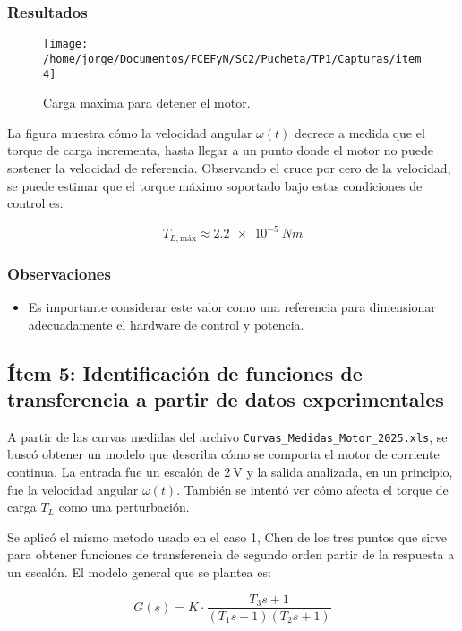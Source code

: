 \documentclass{article}
\begin{document}
\subsubsection*{Resultados}

\begin{figure}[ht!]
      \centering
        \texttt{[image: /home/jorge/Documentos/FCEFyN/SC2/Pucheta/TP1/Capturas/item4]}
          \caption{Carga maxima para detener el motor.}
            \label{fig:etiqueta5}
        \end{figure} 

La figura muestra cómo la velocidad angular $\omega(t)$ decrece a medida que el torque de carga incrementa, hasta llegar a un punto donde el motor no puede sostener la velocidad de referencia. Observando el cruce por cero de la velocidad, se puede estimar que el torque máximo soportado bajo estas condiciones de control es:

\[
T_{L, \text{máx}} \approx \SI{2.2e-5}{Nm}
\]


\subsubsection*{Observaciones}
\begin{itemize}
    \item Es importante considerar este valor como una referencia para dimensionar adecuadamente el hardware de control y potencia.
\end{itemize}



\subsection{Ítem 5: Identificación de funciones de transferencia a partir de datos experimentales}

A partir de las curvas medidas del archivo \texttt{Curvas\_Medidas\_Motor\_2025.xls}, se buscó obtener un modelo que describa cómo se comporta el motor de corriente continua. La entrada fue un escalón de $2\ \text{V}$ y la salida analizada, en un principio, fue la velocidad angular $\omega(t)$. También se intentó ver cómo afecta el torque de carga $T_L$ como una perturbación.


Se aplicó el mismo metodo usado en el caso 1, Chen de los tres puntos que sirve para obtener funciones de transferencia de segundo orden partir de la respuesta a un escalón. El modelo general que se plantea es:

\begin{equation}
    G(s) = K \cdot \frac{T_3 s + 1}{(T_1 s + 1)(T_2 s + 1)}
\end{equation}
\end{document}
